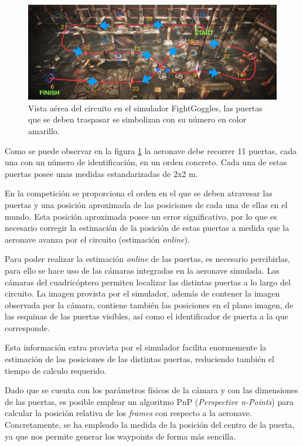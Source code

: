 \begin{figure}[htb!]
	\centering
	\includegraphics[width=\textwidth]{imagenes/diagramacircuito}
	\caption{Vista aérea del circuito en el simulador FightGoggles, las puertas que se deben traspasar se simbolizan con su número en color amarillo.}
	\label{waypoints:circuito}
\end{figure}

Como se puede observar en la figura \ref{waypoints:circuito} la aeronave debe recorrer 11 puertas, cada una con un número de identificación, en un orden concreto. Cada una de estas puertas posee unas medidas estandarizadas de 2x2 m.

En la competición se proporciona el orden en el que se deben atravesar las puertas y una posición aproximada de las posiciones de cada una de ellas en el mundo. Esta posición aproximada posee un error significativo, por lo que es necesario corregir la estimación de la posición de estas puertas a medida que la aeronave avanza por el circuito (estimación \textit{online}).

Para poder realizar la estimación \textit{online} de las puertas, es necesario percibirlas, para ello se hace uso de las cámaras integradas en la aeronave simulada. Las cámaras del cuadricóptero permiten localizar las distintas puertas a lo largo del circuito. La imagen provista por el simulador, además de contener la imagen observada por la cámara, contiene también las posiciones en el plano imagen, de las esquinas de las puertas visibles, así como el identificador de puerta a la que corresponde.


Esta información extra provista por el simulador facilita enormemente la estimación de las posiciones de las distintas puertas, reduciendo también el tiempo de calculo requerido.



Dado que se cuenta con los parámetros físicos de la cámara y con las dimensiones de las puertas, es posible emplear un algoritmo PnP (\textit{Perspective n-Points}) para calcular la posición relativa de los \textit{frames} con respecto a la aeronave. Concretamente, se ha empleado la medida de la posición del centro de la puerta, ya que nos permite generar los waypoints de forma más sencilla.







